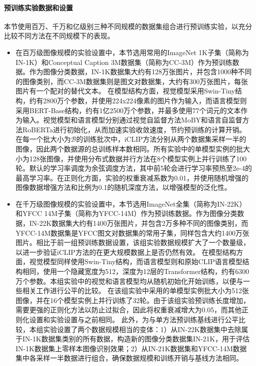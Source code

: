 \paragraph{预训练实验数据和设置} 本节使用百万、千万和亿级别三种不同规模的数据集组合进行预训练实验，以充分比较不同方法在不同规模下的表现。
\begin{itemize}
    \item 在百万级图像规模的实验设置中，本节选用常用的ImageNet 1K子集（简称为IN-1K）和Conceptual Caption 3M数据集\cite{sharma-etal-2018-conceptual}（简称为CC-3M）作为预训练数据。作为图像分类数据，IN-1K数据集大约有128万张图片，并包含1000种不同的图像类别，而CC-3M数据集则是图文对数据集，大约有300万张图片，每张图片有一个配对的替代文本。
    在模型结构方面，视觉模型采用Swin-Tiny\cite{Swin}结构，约有2800万个参数，并使用224x224像素的图片作为输入，而语言模型则采用BERT-Base\cite{BERT}结构，约有1亿2500万个参数，并最多使用77个词元的文本作为输入。视觉模型和语言模型分别通过视觉自监督方法MoBY\cite{MoBY}和语言自监督方法RoBERTa\cite{liu2019roberta}进行初始化，从而加速实验收敛速度，节约预训练的计算开销。
    在每一个批大小为$\mathcal{B}$的训练批次中，iCLIP方法分别从两个数据集采样一半的图像，因此两个数据源的总训练样本数相同。所有实验中的单模型实例的批大小为128张图像，并使用分布式数据并行方法在8个模型实例上并行训练了100轮。默认的学习率调度为余弦调度方法，其中前5轮会进行学习率预热至2e-4的最高学习率。在正则化方面，实验的权重衰减系数为0.01，并使用随机增强\cite{cubuk2020randaugment}的图像数据增强方法和比例为0.1的随机深度\cite{huang2016deep}方法，以增强模型的泛化性。
    \item 在千万级图像规模的实验设置中，本节选用ImageNet全集（简称为IN-22K）和YFCC 14M子集\cite{YFCC100M}（简称为YFCC-14M）作为预训练数据。作为图像分类数据，IN-22K数据集大约有1400万张图片，并包含2万多种不同的图像类别，而YFCC-14M数据集是YFCC图文对数据集\cite{YFCC100M}的常用子集，同样包含大约1400万张图片。相比于前一组预训练数据设置，该组实验数据规模扩大了一个数量级，以进一步验证iCLIP方法的在更大规模数据上是否仍然有效。
    在模型结构方面，视觉模型同样使用Swin-Tiny结构，而语言模型则和原始CLIP语言模型\cite{radford2021learning}结构相同，使用一个隐藏宽度为512，深度为12层的Transformer\cite{Transformer}结构，约有6300万个参数。本组实验中的视觉和语言模型均从随机初始化开始训练，以便与一些相关工作进行公平的比较。
    在该组实验中采用的单模型实例批大小为512张图像，并在16个模型实例上并行训练了32轮。由于该组实验预训练长度增加，需要更强的正则化方法以防止过拟合，因此将权重衰减增大为0.05，而其他正则化设置和实验设置与之前相同。%
    此外，为与单方法预训练基线进行公平比较，本组实验设置了两个数据规模相当的变体：1）从IN-22K数据集中去除属于IN-1K数据集类别的所有数据，构造新的图像分类数据集IN-21K，用于评估IN-1K数据集上零样本图像识别效果；2）从IN-21K数据集和YFCC-14M数据集中各采样一半数据进行组合，确保数据规模和训练开销与基线方法相同。

\end{itemize}
